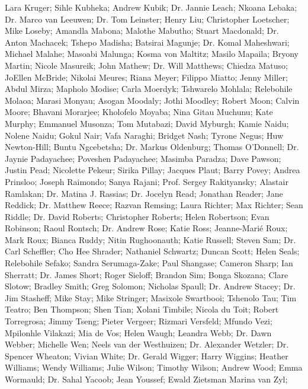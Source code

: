     Lara Kruger;
    Sihle Kubheka;
    Andrew Kubik;
Dr. Jannie Leach;
    Nkoana Lebaka;
Dr. Marco van Leeuwen;
Dr. Tom Leinster;
    Henry Liu;
    Christopher Loetscher;
    Mike Loseby;
    Amandla Mabona;
    Malothe Mabutho;
    Stuart Macdonald;
Dr. Anton Machacek;
    Tshepo Madisha;
    Batsirai Magunje;
Dr. Komal Maheshwari;
    Michael Malahe;
    Masoabi Malunga;
    Kosma von Maltitz;
    Masilo Mapaila;
    Bryony Martin;
    Nicole Masureik;
    John Mathew;
Dr. Will Matthews;
    Chiedza Matuso;
    JoEllen McBride;
    Nikolai Meures;
    Riana Meyer;
    Filippo Miatto;
    Jenny Miller;
    Abdul Mirza;
    Mapholo Modise;
    Carla Moerdyk;
    Tshwarelo Mohlala;
    Relebohile Molaoa;
    Marasi Monyau;
    Asogan Moodaly;
    Jothi Moodley;
    Robert Moon;
    Calvin Moore;
    Bhavani Morarjee;
    Kholofelo Moyaba;
    Nina Gitau Muchunu;
    Kate Murphy;
    Emmanuel Musonza;
    Tom Mutabazi;
    David Myburgh;
    Kamie Naidu;
    Nolene Naidu;
    Gokul Nair;
    Vafa Naraghi;
    Bridget Nash;
    Tyrone Negus;
    Huw Newton-Hill;
    Buntu Ngcebetsha;
Dr. Markus Oldenburg;
    Thomas O’Donnell;
Dr. Jaynie Padayachee;
    Poveshen Padayachee;
    Masimba Paradza;
    Dave Pawson;
    Justin Pead;
    Nicolette Pekeur;
    Sirika Pillay;
    Jacques Plaut;
    Barry Povey;
    Andrea Prinsloo;
    Joseph Raimondo;
    Sanya Rajani;
Prof. Sergey Rakityansky;
    Alastair Ramlakan;
Dr. Matina J. Rassias;
Dr. Jocelyn Read;
    Jonathan Reader;
    Jane Reddick;
Dr. Matthew Reece;
    Razvan Remsing;
    Laura Richter;
    Max Richter;
    Sean Riddle;
Dr. David Roberts;
    Christopher Roberts;
    Helen Robertson;
    Evan Robinson;
    Raoul Rontsch;
Dr. Andrew Rose;
    Katie Ross;
    Jeanne-Marié Roux;
    Mark Roux;
    Bianca Ruddy;
    Nitin Rughoonauth;
    Katie Russell;
    Steven Sam;
Dr. Carl Scheffler;
    Cho Hee Shrader;
    Nathaniel Schwartz;
    Duncan Scott;
    Helen Seals;
    Relebohile Sefako;
    Sandra Serumaga-Zake;
    Paul Shangase;
    Cameron Sharp;
    Ian Sherratt;
Dr. James Short;
    Roger Sieloff;
    Brandon Sim;
    Bonga Skozana;
    Clare Slotow;
    Bradley Smith;
    Greg Solomon;
    Nicholas Spaull;
Dr. Andrew Stacey;
Dr. Jim Stasheff;
    Mike Stay;
    Mike Stringer;
    Masixole Swartbooi;
    Tshenolo Tau;
    Tim Teatro;
    Ben Thompson;
    Shen Tian;
    Xolani Timbile;
    Nicola du Toit;
    Robert Torregrosa;
    Jimmy Tseng;
    Pieter Vergeer;
    Rizmari Versfeld;
    Mfundo Vezi;
    Mpilonhle Vilakazi;
    Mia de Vos;
    Helen Waugh;
    Leandra Webb;
Dr. Dawn Webber;
    Michelle Wen;
    Neels van der Westhuizen;
Dr. Alexander Wetzler;
Dr. Spencer Wheaton;
    Vivian White;
Dr. Gerald Wigger;
    Harry Wiggins;
    Heather Williams;
    Wendy Williams;
    Julie Wilson;
    Timothy Wilson;
    Andrew Wood;
    Emma Wormauld;
Dr. Sahal Yacoob;
    Jean Youssef;
    Ewald Zietsman 
    Marina van Zyl;




